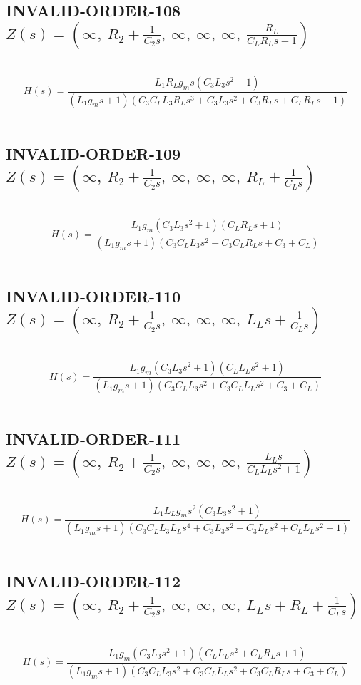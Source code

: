 \documentclass{article}
\begin{document}
\subsection{INVALID-ORDER-108 $Z(s) = \left( \infty, \  R_{2} + \frac{1}{C_{2} s}, \  \infty, \  \infty, \  \infty, \  \frac{R_{L}}{C_{L} R_{L} s + 1}\right)$ } \ 
\textbf{\[H(s) = \frac{L_{1} R_{L} g_{m} s \left(C_{3} L_{3} s^{2} + 1\right)}{\left(L_{1} g_{m} s + 1\right) \left(C_{3} C_{L} L_{3} R_{L} s^{3} + C_{3} L_{3} s^{2} + C_{3} R_{L} s + C_{L} R_{L} s + 1\right)}\] } \ 
\subsection{INVALID-ORDER-109 $Z(s) = \left( \infty, \  R_{2} + \frac{1}{C_{2} s}, \  \infty, \  \infty, \  \infty, \  R_{L} + \frac{1}{C_{L} s}\right)$ } \ 
\textbf{\[H(s) = \frac{L_{1} g_{m} \left(C_{3} L_{3} s^{2} + 1\right) \left(C_{L} R_{L} s + 1\right)}{\left(L_{1} g_{m} s + 1\right) \left(C_{3} C_{L} L_{3} s^{2} + C_{3} C_{L} R_{L} s + C_{3} + C_{L}\right)}\] } \ 
\subsection{INVALID-ORDER-110 $Z(s) = \left( \infty, \  R_{2} + \frac{1}{C_{2} s}, \  \infty, \  \infty, \  \infty, \  L_{L} s + \frac{1}{C_{L} s}\right)$ } \ 
\textbf{\[H(s) = \frac{L_{1} g_{m} \left(C_{3} L_{3} s^{2} + 1\right) \left(C_{L} L_{L} s^{2} + 1\right)}{\left(L_{1} g_{m} s + 1\right) \left(C_{3} C_{L} L_{3} s^{2} + C_{3} C_{L} L_{L} s^{2} + C_{3} + C_{L}\right)}\] } \ 
\subsection{INVALID-ORDER-111 $Z(s) = \left( \infty, \  R_{2} + \frac{1}{C_{2} s}, \  \infty, \  \infty, \  \infty, \  \frac{L_{L} s}{C_{L} L_{L} s^{2} + 1}\right)$ } \ 
\textbf{\[H(s) = \frac{L_{1} L_{L} g_{m} s^{2} \left(C_{3} L_{3} s^{2} + 1\right)}{\left(L_{1} g_{m} s + 1\right) \left(C_{3} C_{L} L_{3} L_{L} s^{4} + C_{3} L_{3} s^{2} + C_{3} L_{L} s^{2} + C_{L} L_{L} s^{2} + 1\right)}\] } \ 
\subsection{INVALID-ORDER-112 $Z(s) = \left( \infty, \  R_{2} + \frac{1}{C_{2} s}, \  \infty, \  \infty, \  \infty, \  L_{L} s + R_{L} + \frac{1}{C_{L} s}\right)$ } \ 
\textbf{\[H(s) = \frac{L_{1} g_{m} \left(C_{3} L_{3} s^{2} + 1\right) \left(C_{L} L_{L} s^{2} + C_{L} R_{L} s + 1\right)}{\left(L_{1} g_{m} s + 1\right) \left(C_{3} C_{L} L_{3} s^{2} + C_{3} C_{L} L_{L} s^{2} + C_{3} C_{L} R_{L} s + C_{3} + C_{L}\right)}\] } \ 
\end{document}
